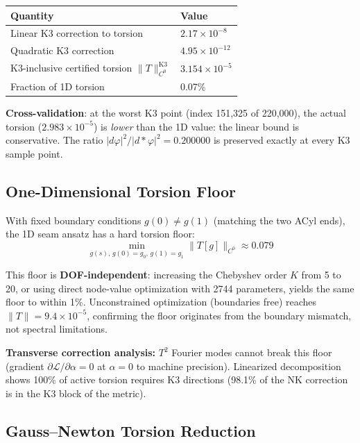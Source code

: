 \documentclass[11pt,a4paper]{article}
\newcommand{\norm}[1]{\|#1\|}
\theoremstyle{remark}
\begin{document}
\begin{table}[H]
\centering
\begin{tabular}{ll}
\toprule
\textbf{Quantity} & \textbf{Value} \\
\midrule
Linear K3 correction to torsion & $2.17 \times 10^{-8}$ \\
Quadratic K3 correction & $4.95 \times 10^{-12}$ \\
K3-inclusive certified torsion $\norm{T}_{C^0}^{\mathrm{K3}}$ & $3.154 \times 10^{-5}$ \\
Fraction of 1D torsion & 0.07\% \\
\bottomrule
\end{tabular}
\end{table}

\textbf{Cross-validation}: at the worst K3 point (index 151,325 of 220,000), the actual
torsion ($2.983 \times 10^{-5}$) is \textit{lower} than the 1D value: the linear bound is
conservative. The ratio $|d\varphi|^2/|d{*}\varphi|^2 = 0.200000$ is preserved exactly at every K3
sample point.

\subsection{One-Dimensional Torsion Floor}\label{sec:torsion_floor}

With fixed boundary conditions $g(0) \neq g(1)$ (matching the two ACyl ends), the 1D seam
ansatz has a hard torsion floor:
\begin{equation}\label{eq:torsion_floor}
\min_{g(s),\, g(0)=g_0,\, g(1)=g_1} \norm{T[g]}_{C^0} \approx 0.079
\end{equation}

This floor is \textbf{DOF-independent}: increasing the Chebyshev order $K$ from 5 to 20, or
using direct node-value optimization with 2744 parameters, yields the same floor to
within 1\%. Unconstrained optimization (boundaries free) reaches $\norm{T} = 9.4 \times 10^{-5}$,
confirming the floor originates from the boundary mismatch, not spectral limitations.

\textbf{Transverse correction analysis:} $T^2$ Fourier modes cannot break this floor
(gradient $\partial\mathcal{L}/\partial\alpha = 0$ at $\alpha = 0$ to machine precision). Linearized decomposition shows
100\% of active torsion requires K3 directions (98.1\% of the NK correction is in the
K3 block of the metric).

\subsection{Gauss--Newton Torsion Reduction}\label{sec:gauss_newton}
\end{document}
